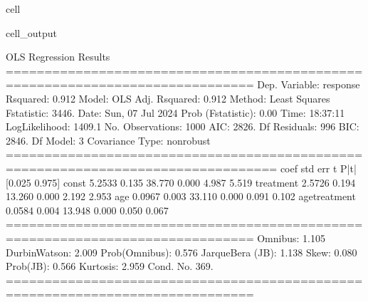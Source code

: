 \documentclass[letterpaper,10pt,english]{jupyterBook}
\begin{document}
\begin{sphinxuseclass}{cell}
\begin{sphinxVerbatimOutput}
\begin{sphinxuseclass}{cell_output}
\begin{sphinxVerbatim}[commandchars=\\\{\}]
                            OLS Regression Results                            
==============================================================================
Dep. Variable:               response   R\PYGZhy{}squared:                       0.912
Model:                            OLS   Adj. R\PYGZhy{}squared:                  0.912
Method:                 Least Squares   F\PYGZhy{}statistic:                     3446.
Date:                Sun, 07 Jul 2024   Prob (F\PYGZhy{}statistic):               0.00
Time:                        18:37:11   Log\PYGZhy{}Likelihood:                \PYGZhy{}1409.1
No. Observations:                1000   AIC:                             2826.
Df Residuals:                     996   BIC:                             2846.
Df Model:                           3                                         
Covariance Type:            nonrobust                                         
=================================================================================
                    coef    std err          t      P\PYGZgt{}|t|      [0.025      0.975]
\PYGZhy{}\PYGZhy{}\PYGZhy{}\PYGZhy{}\PYGZhy{}\PYGZhy{}\PYGZhy{}\PYGZhy{}\PYGZhy{}\PYGZhy{}\PYGZhy{}\PYGZhy{}\PYGZhy{}\PYGZhy{}\PYGZhy{}\PYGZhy{}\PYGZhy{}\PYGZhy{}\PYGZhy{}\PYGZhy{}\PYGZhy{}\PYGZhy{}\PYGZhy{}\PYGZhy{}\PYGZhy{}\PYGZhy{}\PYGZhy{}\PYGZhy{}\PYGZhy{}\PYGZhy{}\PYGZhy{}\PYGZhy{}\PYGZhy{}\PYGZhy{}\PYGZhy{}\PYGZhy{}\PYGZhy{}\PYGZhy{}\PYGZhy{}\PYGZhy{}\PYGZhy{}\PYGZhy{}\PYGZhy{}\PYGZhy{}\PYGZhy{}\PYGZhy{}\PYGZhy{}\PYGZhy{}\PYGZhy{}\PYGZhy{}\PYGZhy{}\PYGZhy{}\PYGZhy{}\PYGZhy{}\PYGZhy{}\PYGZhy{}\PYGZhy{}\PYGZhy{}\PYGZhy{}\PYGZhy{}\PYGZhy{}\PYGZhy{}\PYGZhy{}\PYGZhy{}\PYGZhy{}\PYGZhy{}\PYGZhy{}\PYGZhy{}\PYGZhy{}\PYGZhy{}\PYGZhy{}\PYGZhy{}\PYGZhy{}\PYGZhy{}\PYGZhy{}\PYGZhy{}\PYGZhy{}\PYGZhy{}\PYGZhy{}\PYGZhy{}\PYGZhy{}
const             5.2533      0.135     38.770      0.000       4.987       5.519
treatment         2.5726      0.194     13.260      0.000       2.192       2.953
age               0.0967      0.003     33.110      0.000       0.091       0.102
age\PYGZus{}treatment     0.0584      0.004     13.948      0.000       0.050       0.067
==============================================================================
Omnibus:                        1.105   Durbin\PYGZhy{}Watson:                   2.009
Prob(Omnibus):                  0.576   Jarque\PYGZhy{}Bera (JB):                1.138
Skew:                          \PYGZhy{}0.080   Prob(JB):                        0.566
Kurtosis:                       2.959   Cond. No.                         369.
==============================================================================


\end{sphinxVerbatim}
\end{sphinxuseclass}
\end{sphinxVerbatimOutput}
\end{sphinxuseclass}
\end{document}
